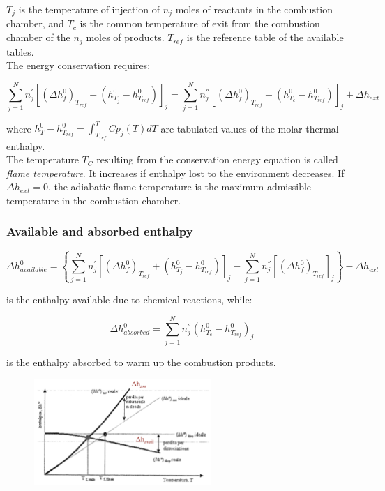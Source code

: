 \documentclass[12pt]{article}
\begin{document}
$T_{j}$ is the temperature of injection of $n_{j}$ moles of reactants in the combustion chamber, and $T_{c}$ is the common temperature of exit from the combustion chamber of the $n_{j}$ moles of products.
$T_{ref}$ is the reference table of the available tables.\\
The energy conservation requires:

\begin{equation}
    \sum_{j=1}^{N}n_{j}^{'}[(\Delta h_{f}^{0})_{T_{ref}}+(h_{T_{j}}^{0}-h_{T_{ref}}^{0})]_{j}
    =
    \sum_{j=1}^{N}n_{j}^{''}[(\Delta h_{f}^{0})_{T_{ref}}+(h_{T_{c}}^{0}-h_{T_{ref}}^{0})]_{j}+\Delta h_{ext}
\end{equation}

where $h_{T}^{0}-h_{T_{ref}}^{0} = \int_{T_{ref}}^{T} Cp_{j}(T)dT$ are tabulated values of the molar thermal enthalpy.\\
The temperature $T_{C}$ resulting from the conservation energy equation is called \textit{flame temperature}. It increases if enthalpy lost to the environment decreases. If $\Delta h_{ext}=0$, the adiabatic flame temperature is the maximum admissible temperature in the combustion chamber.

\subsubsection{Available and absorbed enthalpy}

\begin{equation}
    \Delta h_{available}^{0} = \left\{
    \sum_{j=1}^{N}n_{j}^{'}[(\Delta h_{f}^{0})_{T_{ref}}+(h_{T_{j}}^{0}-h_{T_{ref}}^{0})]_{j}
    -
    \sum_{j=1}^{N}n_{j}^{''}[(\Delta h_{f}^{0})_{T_{ref}}]_{j}\right\} - \Delta h_{ext}
\end{equation}

is the enthalpy available due to chemical reactions, while:

\begin{equation}
    \Delta h_{absorbed}^{0} = \sum_{j=1}^{N}n_{j}^{''}(h_{T_{c}}^{0}-h_{T_{ref}}^{0})_{j}
\end{equation}

is the enthalpy absorbed to warm up the combustion products.

\begin{figure}[h!]
\centering
\includegraphics[width=0.6\textwidth]{figures/availablevsabsorbed.png}
\end{figure}
\end{document}
